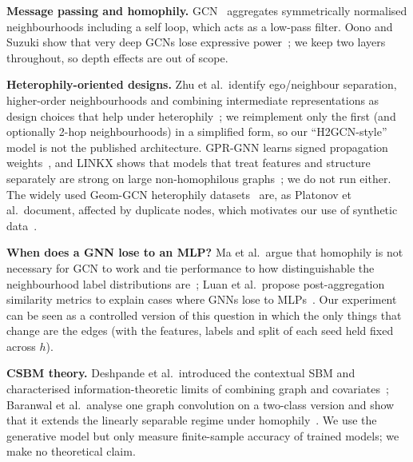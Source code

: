 \textbf{Message passing and homophily.} GCN~\cite{kipf2016semi} aggregates symmetrically normalised neighbourhoods including a self loop, which acts as a low-pass filter. Oono and Suzuki show that very deep GCNs lose expressive power~\cite{oono2019graph}; we keep two layers throughout, so depth effects are out of scope.

\textbf{Heterophily-oriented designs.} Zhu et al.\ identify ego/neighbour separation, higher-order neighbourhoods and combining intermediate representations as design choices that help under heterophily~\cite{zhu2020beyond}; we reimplement only the first (and optionally 2-hop neighbourhoods) in a simplified form, so our ``H2GCN-style'' model is not the published architecture. GPR-GNN learns signed propagation weights~\cite{chien2020adaptive}, and LINKX shows that models that treat features and structure separately are strong on large non-homophilous graphs~\cite{lim2021large}; we do not run either. The widely used Geom-GCN heterophily datasets~\cite{pei2020geom} are, as Platonov et al.\ document, affected by duplicate nodes, which motivates our use of synthetic data~\cite{platonov2023critical}.

\textbf{When does a GNN lose to an MLP?} Ma et al.\ argue that homophily is not necessary for GCN to work and tie performance to how distinguishable the neighbourhood label distributions are~\cite{ma2021is}; Luan et al.\ propose post-aggregation similarity metrics to explain cases where GNNs lose to MLPs~\cite{luan2022revisiting}. Our experiment can be seen as a controlled version of this question in which the only things that change are the edges (with the features, labels and split of each seed held fixed across $h$).

\textbf{CSBM theory.} Deshpande et al.\ introduced the contextual SBM and characterised information-theoretic limits of combining graph and covariates~\cite{deshpande2018contextual}; Baranwal et al.\ analyse one graph convolution on a two-class version and show that it extends the linearly separable regime under homophily~\cite{baranwal2021graph}. We use the generative model but only measure finite-sample accuracy of trained models; we make no theoretical claim.
